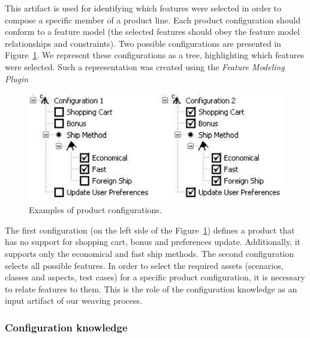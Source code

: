 \documentclass[11pt]{report}
\begin{document}
This artifact is used for identifying which features were selected in order to compose a specific member of a product line. Each product configuration should conform to a feature model (the selected features should obey the feature model relationships and constraints). Two possible configurations are presented in Figure~\ref{fig:product-config-01-02}. We represent these configurations as a tree, highlighting which features were selected. Such a representation was created using the \emph{Feature Modeling Plugin}~\cite{czarnecki-eclipse-2004} 

 \begin{figure}[h]
 \begin{center}
  \includegraphics[scale=0.40]{img/pc-03.eps}
    \caption{Examples of product configurations.}
  \label{fig:product-config-01-02}
  \end{center}
\end{figure}

  
The first configuration (on the left side of the Figure~\ref{fig:product-config-01-02}) defines a product that has no support for shopping cart, bonus and preferences update. Additionally, it supports only the economical and fast ship methods. The second configuration selects all possible features. 
In order to select the required assets (scenarios, classes and aspects, test cases) for a specific product configuration, it is necessary to relate features to them. This is the role of the configuration knowledge as an input artifact of our weaving process.  

\subsubsection{Configuration knowledge}\label{subsub:ck}
\end{document}
